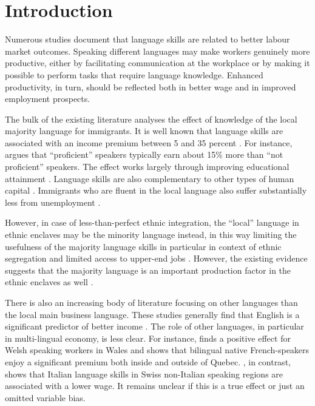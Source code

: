 \documentclass[12pt, a4paper]{article}
\begin{document}
\section{Introduction}
\label{sec:introduction}
Numerous studies document that language skills are related to better
labour market outcomes.
Speaking different languages may make workers genuinely more
productive, either by facilitating communication at the workplace
or by making it possible to perform
tasks that require language knowledge.
Enhanced productivity, in turn, should be reflected both in better wage
and in improved employment prospects.

The bulk of the existing literature analyses the effect of knowledge
of the local majority language for immigrants. It is well known that
language skills are associated with an income premium
between 5 and 35 percent
\citep{Chiswick1995,bleakley+chin2004,shields+price2002,leslie+lindley2001,chiswick+miller2002,Chiswick2010,Chiswick2015, Dustmann2003}. For
instance, \citet{chiswick2008} argues that ``proficient'' speakers
typically earn about 15\% more than ``not proficient'' speakers.
The effect works largely through improving educational attainment
\citep{bleakley+chin2004,rooth+saarela2007native}. Language skills are
also complementary to other types of human capital
\citep{chiswick+miller2007}.
Immigrants who are fluent in the local language also suffer
substantially less from unemployment \citep{shields+price2002, Dustmann2003}.



However, in case of less-than-perfect ethnic integration, the ``local''
language in ethnic enclaves may be the minority language instead, in
this way limiting the usefulness of the majority language skills
\citep{chiswick+miller2002,hwang+2010} in particular in context of ethnic segregation and
limited access to upper-end jobs \citep{Toomet2011}. However, the
existing evidence suggests that the majority language is
an important production factor in the ethnic enclaves as well
\citep{zhou+logan1989, clark+drinkwater2000}.


There is also an increasing body of literature focusing on other languages than the local main business language. These studies generally find
that English is a significant predictor of better income
\citep{Lang2009, Casale2011, Toomet2011, Williams2011, azam+2013EDandCC, isphording2013, fabo+2017E}.
The role of other languages, in particular in multi-lingual economy, is
less clear. For instance,
\cite{Drinkwater1997} finds
a positive effect for Welsh speaking workers in
Wales and \cite{Armstrong2015} shows that bilingual native French-speakers enjoy
a significant premium both inside and outside of Quebec.
\citet{FrancoisGrin1998}, in contrast,
shows that Italian language skills in Swiss non-Italian speaking
regions are associated with a lower wage. It remains unclear if
this is a true effect or just an omitted variable bias.
\end{document}
